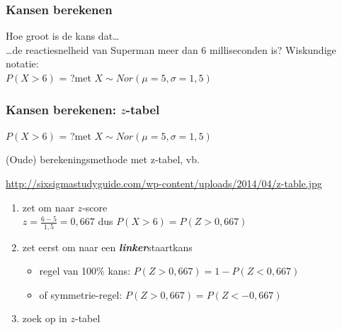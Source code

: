 \documentclass[aspectratio=169]{beamer}
\begin{document}
\begin{frame}
\frametitle{Kansen berekenen}
Hoe groot is de kans dat\dots\\
\dots de reactiesnelheid van Superman meer dan 6 milliseconden is?
\vfill
Wiskundige notatie:\\
\hspace{1cm}$P( X > 6)$ = ?\hspace{1cm}met $X \sim Nor(\mu=5,\sigma=1,5)$
\vfill
\begin{center}
\end{center}
\end{frame}

\begin{frame}
  \frametitle{Kansen berekenen: $z$-tabel}
  
  $P( X > 6)$ = ?\hspace{1cm}met $X \sim Nor(\mu=5,\sigma=1,5)$
  
  \bigskip

  (Oude) berekeningsmethode met z-tabel, vb.
  
  \url{http://sixsigmastudyguide.com/wp-content/uploads/2014/04/z-table.jpg}
  
  \begin{enumerate}
    \pause
    \item zet om naar $z$-score\\
    $z=\frac{6-5}{1,5}=0,667$ dus $P(X>6) = P(Z>0,667)$
    \item zet eerst om naar een \textbf{\textit{linker}}staartkans
    \begin{itemize}
       \item regel van 100\% kans: $P(Z>0,667)=1-P(Z<0,667)$
       \item of symmetrie-regel: $P(Z>0,667)=P(Z<-0,667)$
    \end{itemize}
    \item zoek op in $z$-tabel\\
  \end{enumerate}
\end{frame}
\end{document}
